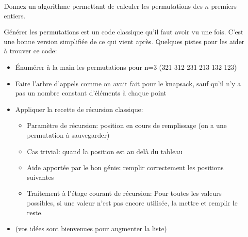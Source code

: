 \documentclass[10pt]{article}\usepackage[nu]{esial}
\begin{document}
\begin{Question}
  Donnez un algorithme permettant de calculer les permutations des $n$ premiers
  entiers.
\end{Question}
\begin{Reponse}
  Générer les permutations est un code classique qu'il faut avoir vu une
  fois. C'est une bonne version simplifiée de ce qui vient après.  Quelques
  pistes pour les aider à trouver ce code:
  \begin{itemize}
  \item Énumérer à la main les permutations pour n=3 (321 312 231 213 132 123)
  \item Faire l'arbre d'appels comme on avait fait pour le knapsack, sauf qu'il
    n'y a pas un nombre constant d'éléments à chaque point
  \item Appliquer la recette de récursion classique:
    \begin{itemize}
    \item Paramètre de récursion: position en cours de remplissage (on a une
      permutation à sauvegarder)
    \item Cas trivial: quand la position est au delà du tableau
    \item Aide apportée par le bon génie: remplir correctement les positions suivantes
    \item Traitement à l'étage courant de récursion: Pour toutes les valeurs
      possibles, si une valeur n'est pas encore utilisée, la mettre et remplir
      le reste.
    \end{itemize}
  \item (vos idées sont bienvenues pour augmenter la liste)
  \end{itemize}
 
  \newcommand*\FancyVerbStopString{// Fin génération, début du test}
\end{Reponse}
\end{document}
